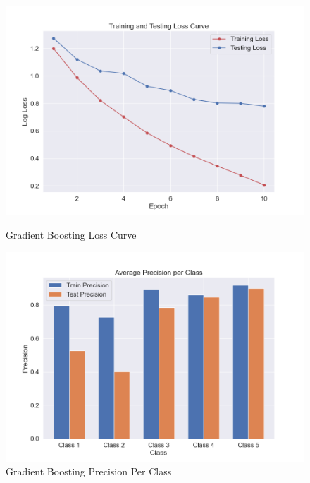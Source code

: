 \begin{figure}[H]
	\vspace{1em}
	
	\begin{minipage}[b]{0.45\textwidth}
		\centering
		\includegraphics[width=\textwidth]{img/paper_1//loss_curve.png}
		\caption{Gradient Boosting Loss Curve}
	\end{minipage}
	\hfill
	\begin{minipage}[b]{0.45\textwidth}
		\centering
		\includegraphics[width=\textwidth]{img/paper_1//precision_per_class.png}
		\caption{Gradient Boosting Precision Per Class}
	\end{minipage}
\end{figure}
